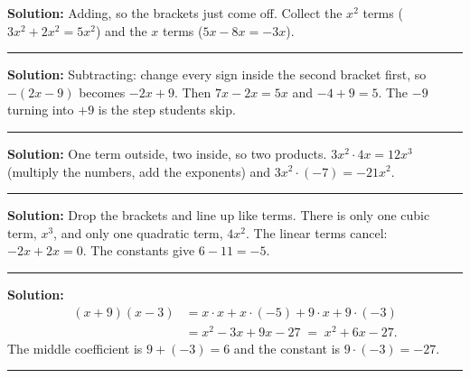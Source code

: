\documentclass[12pt]{article}
\begin{document}



\textbf{Solution:} \quad Adding, so the brackets just come off. Collect the $x^2$ terms
($3x^2 + 2x^2 = 5x^2$) and the $x$ terms ($5x - 8x = -3x$). 

\vspace{0.15cm}\noindent\rule{\linewidth}{0.2pt}


\textbf{Solution:} \quad Subtracting: change every sign inside the second bracket first, so
$-(2x - 9)$ becomes $-2x + 9$. Then $7x - 2x = 5x$ and $-4 + 9 = 5$. The $-9$ turning into $+9$
is the step students skip. 

\vspace{0.15cm}\noindent\rule{\linewidth}{0.2pt}


\textbf{Solution:} \quad One term outside, two inside, so two products.
$3x^2 \cdot 4x = 12x^3$ (multiply the numbers, add the exponents) and
$3x^2\cdot(-7) = -21x^2$. 

\vspace{0.15cm}\noindent\rule{\linewidth}{0.2pt}


\textbf{Solution:} \quad Drop the brackets and line up like terms. There is only one cubic term,
$x^3$, and only one quadratic term, $4x^2$. The linear terms cancel: $-2x + 2x = 0$. The constants
give $6 - 11 = -5$. 

\vspace{0.15cm}\noindent\rule{\linewidth}{0.2pt}


\textbf{Solution:}
\begin{align*}
  (x+9)(x-3) &= x\cdot x + x\cdot(-5) + 9\cdot x + 9\cdot(-3)\\
             &= x^2 - 3x + 9x - 27 \;=\; x^2 + 6x - 27.
\end{align*}
The middle coefficient is $9 + (-3) = 6$ and the constant is $9\cdot(-3) = -27$. 

\vspace{0.15cm}\noindent\rule{\linewidth}{0.2pt}
\end{document}
